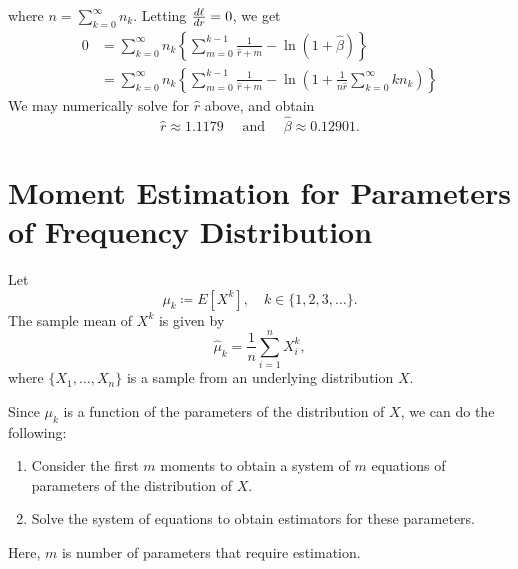 \documentclass[notoc,notitlepage]{tufte-book}
\begin{document}
\begin{solution}
\begin{enumerate}
      where $n = \sum_{k=0}^{\infty} n_k$.
      Letting $\frac{\mathop{}\!d{\ell}}{\mathop{}\!d{r}} = 0$, we get
      \begin{align*}
        0 &= \sum_{k=0}^{\infty} n_k \left\{ \sum_{m=0}^{k-1}
            \frac{1}{\hat{r} + m} - \ln (1 + \hat{\beta}) \right\} \\
          &= \sum_{k=0}^{\infty} n_k \left\{ \sum_{m=0}^{k-1}
            \frac{1}{\hat{r} + m} - \ln \left(1 + \frac{1}{n\hat{r}}
            \sum_{k=0}^{\infty} kn_k \right) \right\}
      \end{align*}  
      We may numerically solve for $\hat{r}$ above, and obtain
      \begin{equation*}
        \hat{r} \approx 1.1179 \quad\text{ and }\quad \hat{\beta} \approx
        0.12901.
      \end{equation*}
  \end{enumerate}
\end{solution}


\section{Moment Estimation for Parameters of Frequency Distribution}%
\label{sec:moment_estimation_for_parameters_of_frequency_distribution}

Let
\begin{equation*}
  \mu_k \coloneqq E[X^k],\quad k \in \{ 1, 2, 3, \ldots \}.
\end{equation*}
The sample mean of $X^k$ is given by
\begin{equation*}
  \hat{\mu}_k = \frac{1}{n} \sum_{i=1}^{n} X_i^k,
\end{equation*}
where $\{ X_1, \ldots, X_n \}$ is a sample from an underlying distribution $X$.


\begin{procedure}\label{procedure:moment_estimation}
  Since $\mu_k$ is a function of the parameters of the distribution of $X$,
  we can do the following:
  \begin{enumerate}
    \item Consider the first $m$ moments to obtain a system of $m$ equations
      of parameters of the distribution of $X$.
    \item Solve the system of equations to obtain estimators for these
      parameters.
  \end{enumerate}
  Here, $m$ is number of parameters that require estimation.
\end{procedure}
\end{document}
